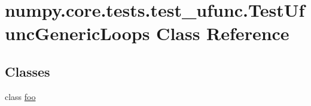 \hypertarget{classnumpy_1_1core_1_1tests_1_1test__ufunc_1_1TestUfuncGenericLoops}{}\section{numpy.\+core.\+tests.\+test\+\_\+ufunc.\+Test\+Ufunc\+Generic\+Loops Class Reference}
\label{classnumpy_1_1core_1_1tests_1_1test__ufunc_1_1TestUfuncGenericLoops}
\subsection*{Classes}
\begin{DoxyCompactItemize}
\item 
class \hyperlink{classnumpy_1_1core_1_1tests_1_1test__ufunc_1_1TestUfuncGenericLoops_1_1foo}{foo}
\end{DoxyCompactItemize}
